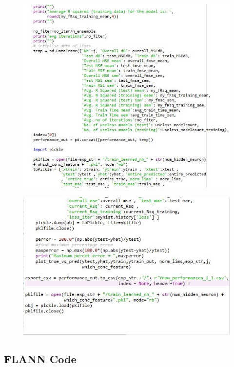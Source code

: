 \documentclass[]{article}
\begin{document}
\begin{figure}
\centering
\includegraphics[width=1\textwidth,height=\textheight]{images/mlp6.jpg}
\end{figure}

\begin{figure}
\centering
\includegraphics[width=1\textwidth,height=\textheight]{images/mlp7.jpg}
\end{figure}


\hypertarget{flann-code}{%
\subsection{FLANN Code}\label{flann-code}}
\end{document}
